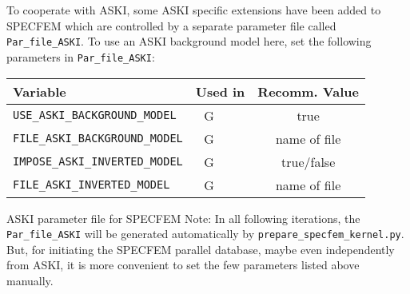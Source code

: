  To cooperate with ASKI, some ASKI specific extensions have been added to SPECFEM which are controlled by a separate parameter file called \verb+Par_file_ASKI+. To use an ASKI background model here, set the following parameters in \verb+Par_file_ASKI+:
  \begin{longtable}{|p{10.5cm}|c|c|c|}\hline
	  Variable & \multicolumn{2}{c|}{Used in} & Recomm. Value \\ \hline
	  \verb+USE_ASKI_BACKGROUND_MODEL+         & G &  & true \\ \hline
	  \verb+FILE_ASKI_BACKGROUND_MODEL+        & G &  & name of file \\ \hline
	  \verb+IMPOSE_ASKI_INVERTED_MODEL+        & G &  & true/false \\ \hline
	  \verb+FILE_ASKI_INVERTED_MODEL+          & G &  & name of file \\ \hline
  \end{longtable}
%
 \begin{infobox}[label={info:parfile-aski},float=h!]{ASKI parameter file for SPECFEM}
   Note: In all following iterations, the \verb+Par_file_ASKI+ will be generated automatically by \verb+prepare_specfem_kernel.py+. But, for initiating the SPECFEM parallel database, maybe even independently from ASKI, it is more convenient to set the few parameters listed above manually.
 \end{infobox}

